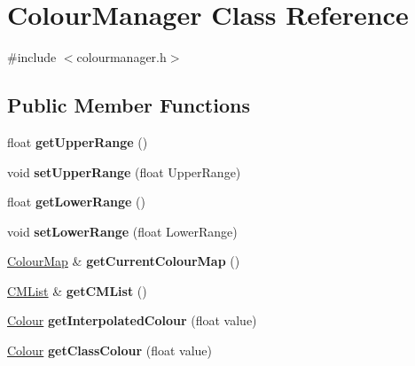 \hypertarget{classColourManager}{}\section{Colour\+Manager Class Reference}
\label{classColourManager}


{\ttfamily \#include $<$colourmanager.\+h$>$}

\subsection*{Public Member Functions}
\begin{DoxyCompactItemize}
\item 
\mbox{\label{classColourManager_af7e420271ffdb8aa1352be8f5c8d2c75}} 
float {\bfseries get\+Upper\+Range} ()
\item 
\mbox{\label{classColourManager_ac9aacdcd5b240defc53e0273fb635501}} 
void {\bfseries set\+Upper\+Range} (float Upper\+Range)
\item 
\mbox{\label{classColourManager_a09c9c0da930b9fe390db80a19e5b96f9}} 
float {\bfseries get\+Lower\+Range} ()
\item 
\mbox{\label{classColourManager_a7555d13ef996799513a1cb1f29245f8d}} 
void {\bfseries set\+Lower\+Range} (float Lower\+Range)
\item 
\mbox{\label{classColourManager_a237206e41b8a7c81fe91ee477f9aeb9d}} 
\hyperlink{classColourMap}{Colour\+Map} \& {\bfseries get\+Current\+Colour\+Map} ()
\item 
\mbox{\label{classColourManager_a846cefeecf0be6b441845ea9f8cb485c}} 
\hyperlink{classCMList}{C\+M\+List} \& {\bfseries get\+C\+M\+List} ()
\item 
\mbox{\label{classColourManager_a316d945e07e2384cd34b5c502865466d}} 
\hyperlink{classColour}{Colour} {\bfseries get\+Interpolated\+Colour} (float value)
\item 
\mbox{\label{classColourManager_a1702cb7bf545735e9971c048612c3571}} 
\hyperlink{classColour}{Colour} {\bfseries get\+Class\+Colour} (float value)

\end{DoxyCompactItemize}
